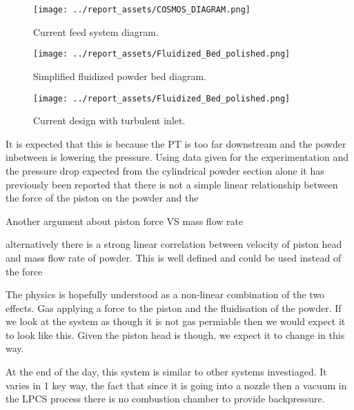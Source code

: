 \begin{figure}[htbp]
    \centering

    \begin{minipage}{0.3\textwidth}
        \centering
        \texttt{[image: ../report\_assets/COSMOS\_DIAGRAM.png]}
        \caption{Current feed system diagram.}\label{fig:current-feed-system-exploded-diagram}
    \end{minipage}
    \hfill
    \begin{minipage}{0.3\textwidth}
        \centering
        \texttt{[image: ../report\_assets/Fluidized\_Bed\_polished.png]}
        \caption{Simplified fluidized powder bed diagram.}\label{fig:fluidized-bed-diagram}
    \end{minipage}
    \hfill
    \begin{minipage}{0.3\textwidth}
        \centering
        \texttt{[image: ../report\_assets/Fluidized\_Bed\_polished.png]}
        \caption{Current design with turbulent inlet.}\label{fig:current-feed-system-fluent}
    \end{minipage}

\end{figure}
It is expected that this is because the PT is too far downstream and the powder inbetween is lowering the pressure. Using data given for the experimentation and the pressure drop expected from the cylindrical powder section alone
it has previously been reported that there is not a simple linear relationship between the force of the piston on the powder and the 


Another argument about piston force VS mass flow rate

alternatively there is a strong linear correlation between velocity of piston head and mass flow rate of powder. This is well defined and could be used instead of the force


The physics is hopefully understood as a non-linear combination of the two effects. Gas applying a force to the piston and the fluidisation of the powder. If we look at the system as though it is not gas permiable then we would expect it to look like this. Given the piston head is though, we expect it to change in this way.

At the end of the day, this system is similar to other systems investiaged. It varies in 1 key way, the fact that since it is going into a nozzle then a vacuum in the LPCS process there is no combustion chamber to provide backpressure.
